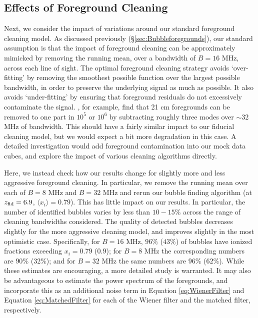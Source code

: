 \subsection{Effects of Foreground Cleaning} \label{sec:BubbleForegroundCleaning}

Next, we consider the impact of variations around our standard foreground
cleaning model. As discussed previously (\S \ref{sec:Bubbleforegrounds}), our
standard assumption is that the impact of foreground cleaning
can be approximately mimicked by removing the running mean, over a bandwidth
of $B=16$ MHz, across each line of sight. The optimal foreground cleaning
strategy avoids `over-fitting' by removing the smoothest possible function
over the largest possible bandwidth, in order to preserve the underlying signal
as much as possible. It also avoids `under-fitting' by ensuring that foreground
residuals do not excessively contaminate the signal. \cite{Liu:2011ih}, for
example, find that 21 cm foregrounds can be removed to one part in
$10^5$ or $10^6$ by subtracting roughly three modes over $\sim 32$ MHz of
bandwidth. This should have a fairly similar impact to our fiducial
cleaning model, but we would expect a bit more degradation in this case.
A detailed investigation would add foreground contamination into our
mock data cubes, and explore the impact of various cleaning algorithms directly.

Here, we instead check how our results change for slightly more
and less aggressive foreground cleaning. In particular, we remove
the running mean over each of $B=8$ MHz and $B=32$ MHz and rerun our
bubble finding algorithm (at $z_{\rm fid} = 6.9$, $\langle x_i \rangle = 0.79$). This has
little impact on our results. In particular, the number of identified
bubbles varies by less than $10-15\%$ across the range of cleaning
bandwidths considered. The quality of detected bubbles decreases slightly
for the more aggressive cleaning model, and improves slightly in the most optimistic
case. Specifically, for $B=16$ MHz, $96\%$ ($43\%$) of bubbles have
ionized fractions exceeding $x_i = 0.79$ ($0.9$); for $B=8$ MHz the
corresponding numbers are $90\%$ ($32\%$); and for $B=32$ MHz
the same numbers are $96\%$ ($62\%$). While these estimates are encouraging,
a more detailed study is warranted. It may also be advantageous to
estimate the power spectrum of the foregrounds, and incorporate this
as an additional noise term in Equation \ref{eq:WienerFilter} and Equation \ref{eq:MatchedFilter} for each of the Wiener filter and the matched filter, respectively.


